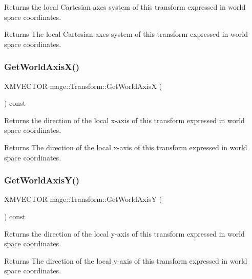 Returns the local Cartesian axes system of this transform expressed in world space coordinates.

\begin{DoxyReturn}{Returns}
The local Cartesian axes system of this transform expressed in world space coordinates. 
\end{DoxyReturn}
\hypertarget{structmage_1_1_transform_ac7a718127c5212bb73d04302371473d0}{}\label{structmage_1_1_transform_ac7a718127c5212bb73d04302371473d0} 
\subsubsection{\texorpdfstring{Get\+World\+Axis\+X()}{GetWorldAxisX()}}
{\footnotesize\ttfamily X\+M\+V\+E\+C\+T\+OR mage\+::\+Transform\+::\+Get\+World\+AxisX (\begin{DoxyParamCaption}{ }\end{DoxyParamCaption}) const}

Returns the direction of the local x-\/axis of this transform expressed in world space coordinates.

\begin{DoxyReturn}{Returns}
The direction of the local x-\/axis of this transform expressed in world space coordinates. 
\end{DoxyReturn}
\hypertarget{structmage_1_1_transform_a9c4452fa4aefb48e4e6c9a4a38fac32c}{}\label{structmage_1_1_transform_a9c4452fa4aefb48e4e6c9a4a38fac32c} 
\subsubsection{\texorpdfstring{Get\+World\+Axis\+Y()}{GetWorldAxisY()}}
{\footnotesize\ttfamily X\+M\+V\+E\+C\+T\+OR mage\+::\+Transform\+::\+Get\+World\+AxisY (\begin{DoxyParamCaption}{ }\end{DoxyParamCaption}) const}

Returns the direction of the local y-\/axis of this transform expressed in world space coordinates.

\begin{DoxyReturn}{Returns}
The direction of the local y-\/axis of this transform expressed in world space coordinates. 
\end{DoxyReturn}
\hypertarget{structmage_1_1_transform_a580b65d46b4af8086fab60d0737fd353}{}\label{structmage_1_1_transform_a580b65d46b4af8086fab60d0737fd353} 
